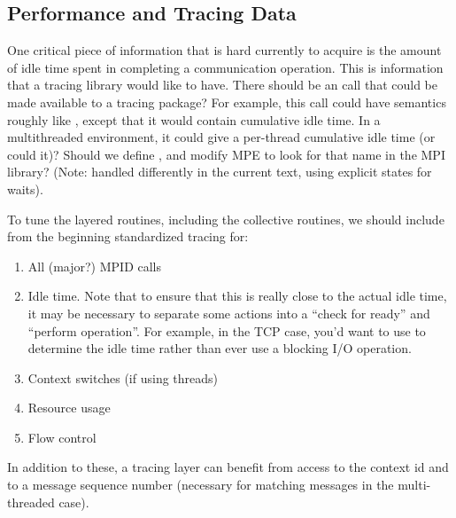 \documentclass{article}
\begin{document}


\subsection{Performance and Tracing Data}
\label{sec:tracing}

One critical piece of information that is hard currently to acquire is
the amount of idle time spent in completing a communication operation.
This is information that a tracing library would like to have.  There should
be an  call that could be made available to a tracing
package?  For example, this call could have semantics roughly like
, except that it would contain cumulative idle time.  In a
multithreaded environment, it could give a per-thread cumulative idle
time (or could it)?  Should we define , and modify MPE
to look for that name in the MPI library? (Note: handled differently in the
current text, using explicit states for waits).

To tune the layered routines, including the collective routines, we
should include from the beginning standardized tracing for:
\begin{enumerate}
\item All (major?) MPID calls
\item Idle time.  Note that to ensure that this is really close to the
actual idle time, it may be necessary to separate some actions into a
``check for ready'' and ``perform operation''.  For example, in the
TCP case, you'd want to use  to determine the idle time
rather than ever use a blocking I/O operation.  
\item Context switches (if using threads)
\item Resource usage
\item Flow control
\end{enumerate}
In addition to these, a tracing layer can benefit from access to the
context id and to a message sequence number (necessary for matching
messages in the multi-threaded case).  
\end{document}
